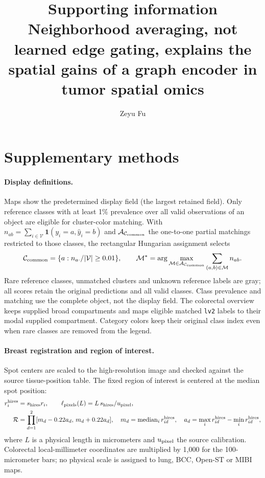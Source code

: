 \documentclass[11pt]{article}
\title{Supporting information\\[2pt]\large Neighborhood averaging, not learned edge gating, explains the spatial gains of a graph encoder in tumor spatial omics}
\author{Zeyu Fu}\date{}
\begin{document}
\raggedbottom\maketitle
\section*{Supplementary methods}
\paragraph{Display definitions.} Maps show the predetermined display field (the largest retained field). Only reference classes with at least 1\% prevalence over all valid observations of an object are eligible for cluster-color matching. With \(n_{ab}=\sum_{i\in\mathcal V}\mathbf1(y_i=a,\widehat y_i=b)\) and \(\mathcal A_{\mathcal C_{\rm common}}\) the one-to-one partial matchings restricted to those classes, the rectangular Hungarian assignment selects
\begin{equation}
\mathcal C_{\rm common}=\{a:n_{a\cdot}/|\mathcal V|\geq0.01\},\qquad
\mathcal M^*=\arg\max_{\mathcal M\in\mathcal A_{\mathcal C_{\rm common}}}\sum_{(a,b)\in\mathcal M}n_{ab}.\label{eq:display-match}
\end{equation}
Rare reference classes, unmatched clusters and unknown reference labels are gray; all scores retain the original predictions and all valid classes. Class prevalence and matching use the complete object, not the display field. The colorectal overview keeps supplied broad compartments and maps eligible matched \texttt{lv2} labels to their modal supplied compartment. Category colors keep their original class index even when rare classes are removed from the legend.

\paragraph{Breast registration and region of interest.} Spot centers are scaled to the high-resolution image and checked against the source tissue-position table. The fixed region of interest is centered at the median spot position:
\begin{equation}\begin{aligned}
r_i^{\rm hires}&=s_{\rm hires}r_i,\qquad
\ell_{\rm pixels}(L)=L\,s_{\rm hires}/u_{\rm pixel},\\
\mathcal R&=\prod_{d=1}^2[m_d-0.22a_d,\,m_d+0.22a_d],\quad
m_d=\operatorname{median}_i r_{id}^{\rm hires},\quad
a_d=\max_i r_{id}^{\rm hires}-\min_i r_{id}^{\rm hires},
\end{aligned}\label{eq:registration}\end{equation}
where \(L\) is a physical length in micrometers and \(u_{\rm pixel}\) the source calibration. Colorectal local-millimeter coordinates are multiplied by 1,000 for the 100-micrometer bars; no physical scale is assigned to lung, BCC, Open-ST or MIBI maps.
\end{document}
